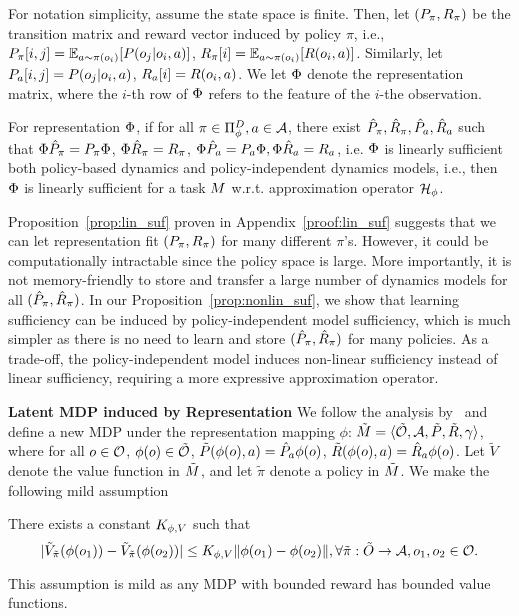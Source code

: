 For notation simplicity, assume the state space is finite.
Then, let $(P_\pi, R_\pi)$ be the transition matrix and reward vector induced by policy $\pi$, i.e., $P_\pi[i,j] = \mathbb{E}_{a \sim \pi(o_i)} [P(o_j|o_i,a)]$, $R_\pi[i] = \mathbb{E}_{a \sim \pi(o_i)} [R(o_i,a)]$. 
Similarly, let $P_a[i,j] = P(o_j|o_i,a)$, $R_a[i] = R(o_i,a)$.
We let $\Phi$ denote the representation matrix, where the $i$-th row of $\Phi$ refers to the feature of the $i$-the observation.

\begin{proposition}
\label{prop:lin_suf}
For representation $\Phi$, if for all $\pi\in\Pi_{\phi}^D, a\in\mathcal{A}$,  there exist $\hat{P}_\pi,\hat{R}_\pi,\hat{P}_a,\hat{R}_a$ such that $\Phi\hat{P}_\pi=P_\pi\Phi$, $\Phi\hat{R}_\pi=R_\pi$, $\Phi\hat{P}_a=P_a\Phi, \Phi\hat{R}_a=R_a$, i.e. $\Phi$ is linearly sufficient both policy-based dynamics and policy-independent dynamics models, i.e., 
then $\Phi$ is linearly sufficient for a task $M$ w.r.t. approximation operator $\mathcal{H}_{\phi}$.
\end{proposition}

Proposition~\ref{prop:lin_suf} proven in Appendix~\ref{proof:lin_suf} suggests that we can let representation fit $(P_\pi,R_\pi)$ for many different $\pi$'s. However, it could be computationally intractable since the policy space is large. More importantly, it is not memory-friendly to store and transfer a large number of dynamics models for all $(\hat{P}_\pi,\hat{R}_\pi)$. 
In our Proposition~\ref{prop:nonlin_suf}, we show that learning sufficiency can be induced by policy-independent model sufficiency, which is much simpler as there is no need to learn and store $(\hat{P}_\pi,\hat{R}_\pi)$ for many policies. As a trade-off, the policy-independent model induces non-linear sufficiency instead of linear sufficiency, requiring a more expressive approximation operator.




\textbf{Latent MDP induced by Representation}\quad
We follow the analysis by~\citet{gelada2019deepmdp} and define a new MDP under the representation mapping $\phi$: $\tilde{M} = \langle \tilde{\mathcal{O}}, \mathcal{A}, \tilde{P}, \tilde{R}, \gamma \rangle$, where for all $o\in\mathcal{O}$, $\phi(o)\in\tilde{\mathcal{O}}$,
$\tilde{P}(\phi(o),a) = \hat{P}_a\phi(o) $, $\tilde{R}(\phi(o),a) = \hat{R}_a \phi(o)$. 
Let $\tilde{V}$ denote the value function in $\tilde{M}$, and let $\tilde{\pi}$ denote a policy in $\tilde{M}$.
We make the following mild assumption
\begin{assumption}
\label{assump:lips}
There exists a constant $K_{\phi,V}$ such that $$ |\tilde{V}_{\tilde{\pi}}(\phi(o_1)) - \tilde{V}_{\tilde{\pi}}(\phi(o_2)) | \leq K_{\phi,V} \|\phi(o_1)-\phi(o_2)\|, \forall \tilde{\pi}:\tilde{O}\to\mathcal{A}, o_1,o_2\in\mathcal{O}.$$
\end{assumption}
This assumption is mild as any MDP with bounded reward has bounded value functions.